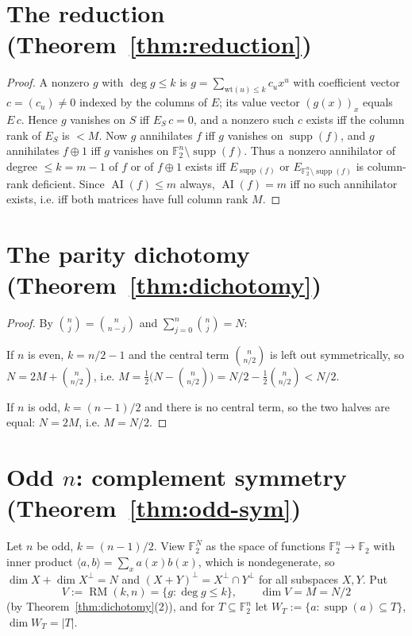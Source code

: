\documentclass{amsart}
\theoremstyle{definition}
\DeclareMathOperator{\AI}{AI}
\DeclareMathOperator{\supp}{supp}
\DeclareMathOperator{\RM}{RM}
\newcommand{\F}{\mathbb{F}}
\begin{document}
\section{The reduction (Theorem~\ref{thm:reduction})}

\begin{proof}
A nonzero $g$ with $\deg g\le k$ is $g=\sum_{\mathrm{wt}(u)\le k}c_ux^u$
with coefficient vector $c=(c_u)\ne0$ indexed by the columns of $E$; its
value vector $(g(x))_x$ equals $E\,c$. Hence $g$ vanishes on $S$ iff
$E_S\,c=0$, and a nonzero such $c$ exists iff the column rank of $E_S$ is
$<M$. Now $g$ annihilates $f$ iff $g$ vanishes on $\supp(f)$, and $g$
annihilates $f\oplus1$ iff $g$ vanishes on $\F_2^n\setminus\supp(f)$. Thus
a nonzero annihilator of degree $\le k=m-1$ of $f$ or of $f\oplus1$ exists
iff $E_{\supp(f)}$ or $E_{\F_2^n\setminus\supp(f)}$ is column-rank
deficient. Since $\AI(f)\le m$ always, $\AI(f)=m$ iff no such annihilator
exists, i.e. iff both matrices have full column rank $M$.
\end{proof}

\section{The parity dichotomy (Theorem~\ref{thm:dichotomy})}

\begin{proof}
By $\binom nj=\binom n{n-j}$ and $\sum_{j=0}^n\binom nj=N$:

If $n$ is even, $k=n/2-1$ and the central term $\binom n{n/2}$ is left out
symmetrically, so $N=2M+\binom n{n/2}$, i.e.
$M=\tfrac12\bigl(N-\binom n{n/2}\bigr)=N/2-\tfrac12\binom n{n/2}<N/2$.

If $n$ is odd, $k=(n-1)/2$ and there is no central term, so the two halves
are equal: $N=2M$, i.e. $M=N/2$.
\end{proof}

\section{Odd $n$: complement symmetry (Theorem~\ref{thm:odd-sym})}
\label{sec:odd-sym}

Let $n$ be odd, $k=(n-1)/2$. View $\F_2^{N}$ as the space of functions
$\F_2^n\to\F_2$ with inner product
$\langle a,b\rangle=\sum_{x}a(x)b(x)$, which is nondegenerate, so
$\dim X+\dim X^{\perp}=N$ and $(X+Y)^{\perp}=X^{\perp}\cap Y^{\perp}$ for
all subspaces $X,Y$. Put
\[
V:=\RM(k,n)=\{g:\deg g\le k\},\qquad \dim V=M=N/2
\]
(by Theorem~\ref{thm:dichotomy}(2)), and for $T\subseteq\F_2^n$ let
$W_T:=\{a:\supp(a)\subseteq T\}$, $\dim W_T=|T|$.
\end{document}
